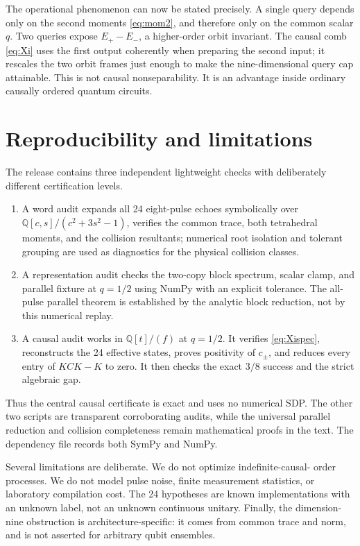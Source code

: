 \documentclass[11pt]{article}
\theoremstyle{definition}
\begin{document}
The operational phenomenon can now be stated precisely.  A single query
depends only on the second moments \cref{eq:mom2}, and therefore only on the
common scalar $q$.  Two queries expose $E_+-E_-$, a higher-order orbit
invariant.  The causal comb \cref{eq:Xi} uses the first output coherently when
preparing the second input; it rescales the two orbit frames just enough to
make the nine-dimensional query cap attainable.  This is not causal
nonseparability.  It is an advantage inside ordinary causally ordered quantum
circuits.

\section{Reproducibility and limitations}

The release contains three independent lightweight checks with deliberately
different certification levels.
\begin{enumerate}
\item A word audit expands all 24 eight-pulse echoes symbolically over
  $\mathbb Q[c,s]/(c^2+3s^2-1)$, verifies the common trace, both tetrahedral
  moments, and the collision resultants; numerical root isolation and tolerant
  grouping are used as diagnostics for the physical collision classes.
\item A representation audit checks the two-copy block spectrum, scalar clamp,
  and parallel fixture at $q=1/2$ using NumPy with an explicit tolerance.  The
  all-pulse parallel theorem is established by the analytic block reduction,
  not by this numerical replay.
\item A causal audit works in $\mathbb Q[t]/(f)$ at $q=1/2$.  It verifies
  \cref{eq:Xispec}, reconstructs the 24 effective states, proves positivity of
  $c_\pm$, and reduces every entry of $KCK-K$ to zero.  It then checks the
  exact $3/8$ success and the strict algebraic gap.
\end{enumerate}
Thus the central causal certificate is exact and uses no numerical SDP.  The
other two scripts are transparent corroborating audits, while the universal
parallel reduction and collision completeness remain mathematical proofs in
the text.  The dependency file records both SymPy and NumPy.

Several limitations are deliberate.  We do not optimize indefinite-causal-
order processes.  We do not model pulse noise, finite measurement statistics,
or laboratory compilation cost.  The 24 hypotheses are known implementations
with an unknown label, not an unknown continuous unitary.  Finally, the
dimension-nine obstruction is architecture-specific: it comes from common
trace and norm, and is not asserted for arbitrary qubit ensembles.
\end{document}
